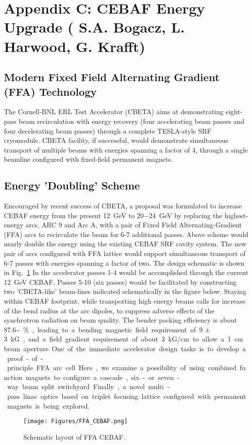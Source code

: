 \section{ Appendix C: CEBAF Energy Upgrade ( S.A. Bogacz, L.  Harwood, G. Krafft)}
%
\subsection{Modern Fixed Field Alternating Gradient (FFA) Technology }
 The Cornell-BNL ERL Test Accelerator (CBETA) aims at demonstrating eight-pass beam recirculation with energy recovery (four accelerating beam passes and four decelerating beam passes) through a complete TESLA-style SRF cryomodule. CBETA facility, if successful, would demonstrate simultaneous transport of multiple  beams with energies spanning a factor of 4, through a single beamline configured with fixed-field permanent magnets.
%

\subsection{Energy 'Doubling' Scheme} 
Encouraged by recent success of CBETA, a proposal was formulated to increase CEBAF energy from the present \SI{12}{~GeV} to \SI{20-24}{~GeV} by replacing the highest-energy arcs, ARC 9 and Arc A, with a pair of Fixed Field Alternating-Gradient (FFA) arcs to recirculate the beam for 6-7 additional passes. Above scheme would nearly double the energy using the existing CEBAF SRF cavity system. The new pair of arcs configured with FFA lattice would support simultaneous transport of 6-7 passes with energies spanning a factor of two. 
The design schematic is shown in Fig.~\ref{fig:FFA_CEBAF} In the accelerator passes 1-4 would be accomplished through the current \SI{12}{~GeV} CEBAF. Passes 5-10 (six passes) would be facilitated by constructing two 'CBETA-like' beam-lines indicated schematically in the figure below. 
Staying within CEBAF footprint, while transporting high energy beams calls for increase of the bend radius at the arc dipoles, to suppress adverse effects of the synchrotron radiation on beam quality. The bender packing efficiency is about  \SI{87.6~}\si{\%}, leading to a bending magnetic field requirement of \SI{9 ± 3}{~kG}, and a field gradient requirement of about \SI{3}{~kG/cm} to allow a \SI{1}{~cm} beam aperture. One of the immediate accelerator design tasks is to develop a proof-of-principle FFA arc cell.  Here, we examine a possibility of using combined function magnets to configure a cascade, six- or seven-way beam split switchyard. 
Finally, a novel multi-pass linac optics based on triplet focusing lattice configured with permanent magnets is being explored.
%
\begin{figure}[tbh]
  \centering
  \texttt{[image: Figures/FFA\_CEBAF.png]}
  \caption{Schematic layout of FFA CEBAF.}
  \label{fig:FFA_CEBAF}
\end{figure}
%
